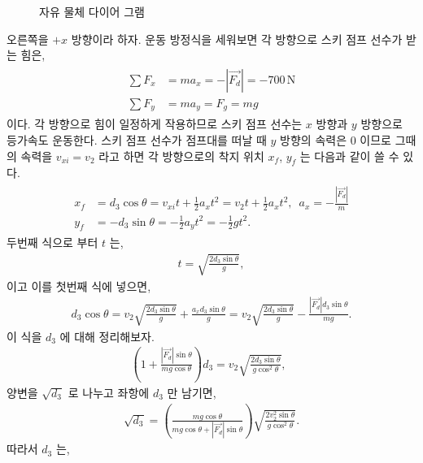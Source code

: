 \documentclass[floatfix,nofootinbib,superscriptaddress,fleqn]{revtex4-2}
\begin{document}
\begin{itemize}
\begin{figure}[h]
 \caption{자유 물체 다이어 그램}
  \end{figure}
  오른쪽을 $+x$ 방향이라 하자. 운동 방정식을 세워보면 각 방향으로 스키 점프 선수가 받는 힘은,
  \begin{align}
    \begin{split}
      \sum F_x &= ma_x = -|\vec{F_d}| = -700\,\mathrm{N} \\
      \sum F_y &= ma_y = F_g = mg 
    \end{split}
  \end{align}
  이다. 각 방향으로 힘이 일정하게 작용하므로 스키 점프 선수는 
  $x$ 방향과 $y$ 방향으로 등가속도 운동한다. 스키 점프 선수가 
  점프대를 떠날 때 $y$ 방향의 속력은 0 이므로 
  그때의 속력을 $v_{xi}=v_2$ 라고 하면 각 방향으로의 착지 위치 $x_f$, $y_f$ 
  는 다음과 같이 쓸 수 있다.
  \begin{align}
    \begin{split}\label{eq:9-1}
      x_f &=d_3\cos{\theta}= v_{xi}t+\frac{1}{2}a_xt^2 = v_2t+\frac{1}{2}a_xt^2,\,\,\,
      a_x=-\frac{|\vec{F_d}|}{m}  \\
      y_f &=-d_3\sin{\theta}= -\frac{1}{2}a_yt^2 = -\frac{1}{2}gt^2.
    \end{split}
  \end{align}
  두번째 식으로 부터 $t$ 는,
  \begin{align}\label{eq:9-2}
    t = \sqrt{\frac{2d_3\sin{\theta}}{g}},
  \end{align}
  이고 이를 첫번째 식에 넣으면,
  \begin{align}
    d_3\cos{\theta}=v_2\sqrt{\frac{2d_3\sin{\theta}}{g}}+\frac{a_xd_3\sin{\theta}}{g}
    =v_2\sqrt{\frac{2d_3\sin{\theta}}{g}}-\frac{|\vec{F_d}|d_3\sin{\theta}}{mg}.
  \end{align}
  이 식을 $d_3$ 에 대해 정리해보자.
  \begin{align}
    \left(1+\frac{|\vec{F_d}|\sin{\theta}}{mg\cos{\theta}}\right)d_3
    =v_2\sqrt{\frac{2d_3\sin{\theta}}{g\cos^2{\theta}}},\,\,\,
  \end{align}
  양변을 $\sqrt{d_3}$ 로 나누고 좌항에 $d_3$ 만 남기면,
  \begin{align}
    \sqrt{d_3}=\left(\frac{mg\cos{\theta}}{mg\cos{\theta}
    +|\vec{F_d}|\sin{\theta}}\right)
    \sqrt{\frac{2v_2^2\sin{\theta}}{g\cos^2{\theta}}}.
  \end{align}
  따라서 $d_3$ 는,
  \begin{align}

\end{align}
\end{itemize}
\end{document}

